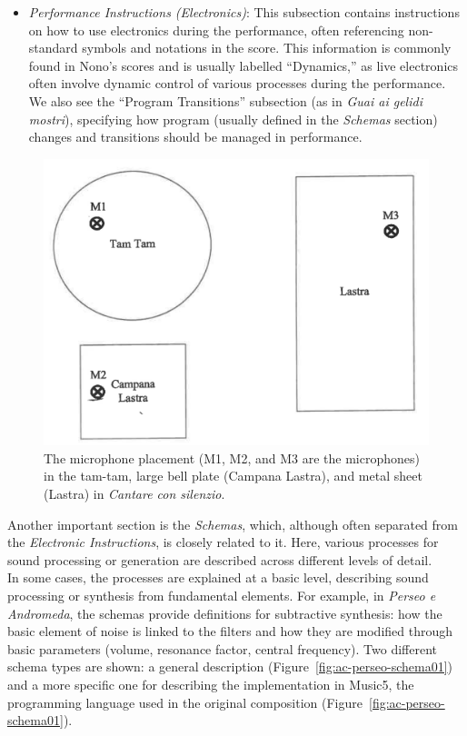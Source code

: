 \begin{itemize}
    \item \textit{Performance Instructions (Electronics)}: This subsection contains instructions on how to use electronics during the performance, often referencing non-standard symbols and notations in the score. This information is commonly found in Nono's scores and is usually labelled ``Dynamics,'' as live electronics often involve dynamic control of various processes during the performance. We also see the ``Program Transitions'' subsection (as in \textit{Guai ai gelidi mostri}), specifying how program (usually defined in the \textit{Schemas} section) changes and transitions should be managed in performance.
\end{itemize}

\begin{figure}[!h]
    \centering
    \includegraphics[width=0.8\linewidth]{chapters/appendix/c/image/figc-microphones.png}
    \caption{The microphone placement (M1, M2, and M3 are the microphones) in the tam-tam, large bell plate (Campana Lastra), and metal sheet (Lastra) in \textit{Cantare con silenzio}.}
    \label{fig:ac-microphones}
\end{figure}

Another important section is the \textit{Schemas}, which, although often separated from the \textit{Electronic Instructions}, is closely related to it. Here, various processes for sound processing or generation are described across different levels of detail.\\
In some cases, the processes are explained at a basic level, describing sound processing or synthesis from fundamental elements. For example, in \textit{Perseo e Andromeda}, the schemas provide definitions for subtractive synthesis: how the basic element of noise is linked to the filters and how they are modified through basic parameters (volume, resonance factor, central frequency). Two different schema types are shown: a general description (Figure~\ref{fig:ac-perseo-schema01}) and a more specific one for describing the implementation in Music5, the programming language used in the original composition (Figure~\ref{fig:ac-perseo-schema01}).

